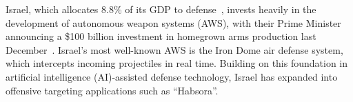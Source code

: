 Israel, which allocates 8.8\% of its GDP to defense~\citep{sipri2025milex}, invests heavily in the development of autonomous weapon systems (AWS), with their Prime Minister announcing a \$100 billion investment in homegrown arms production last December~\citep{netanyahu2025arms}. Israel's most well-known AWS is the Iron Dome air defense system, which intercepts incoming projectiles in real time.  Building on this foundation in artificial intelligence (AI)-assisted defense technology, Israel has expanded into offensive targeting applications such as ``Habsora''.
